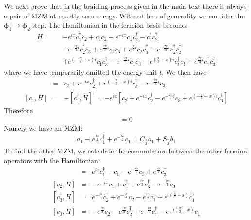 \documentclass[aps,prb,showpacs,amsmath,amssymb,superscriptaddress]{revtex4-2}
\begin{document}
We next prove that in the braiding process given in the main text there is always a pair of MZM at exactly zero energy. Without loss of generality we consider the $\boldsymbol{\phi}_1\rightarrow \boldsymbol{\phi}_2$ step. The Hamiltonian in the fermion basis becomes
\begin{eqnarray}
H =&& - e^{ix}c_1^\dag c_2 + c_1 c_2 + e^{-ix}c_1 c_2^\dag - c_1^\dag c_2^\dag \\\nonumber
&&- e^{-\frac{\pi}{3}i} c_2^\dag c_3 + e^{\frac{2\pi}{3}i} c_2 c_3 + e^{\frac{\pi}{3}i}c_2 c_3^\dag - e^{-\frac{2\pi}{3}i} c_2^\dag c_3^\dag \\\nonumber
&&+  e^{\left(-\frac{\pi}{3}-x\right)i} c_1 c_3^\dag  - e^{-\frac{2\pi}{3}i} c_1 c_3  - e^{\left(\frac{\pi}{3}+x\right)i} c_1^\dag c_3  + e^{\frac{2\pi}{3}i}  c_1^\dag c_3^\dag
\end{eqnarray}
where we have temporarily omitted the energy unit $t$. We then have
\begin{eqnarray}
	[c_1^\dag, H] &=& c_2 + e^{-ix} c_2^\dag + e^{\left(-\frac{\pi}{3}-x\right)i} c_3^\dag - e^{-\frac{2\pi}{3}i} c_3 \\\nonumber
	[c_1, H] &=& -[c_1^\dag, H]^\dag = -e^{ix} \left[ c_2 + e^{-i x}c_2^\dag - e^{-\frac{2\pi}{3}i} c_3 +  e^{\left(-\frac{\pi}{3}-x\right)i} c_3^\dag \right]
\end{eqnarray}
Therefore
\begin{eqnarray}
	[e^{\frac{ix}{2}}c_1^\dag + e^{-\frac{ix}{2}} c_1, H] = 0
\end{eqnarray}
Namely we have an MZM:
\begin{eqnarray}
	\tilde{a}_1 \equiv e^{\frac{ix}{2}}c_1^\dag + e^{-\frac{ix}{2}} c_1 = C_{\frac{x}{2}} a_1 + S_{\frac{x}{2}} b_1
\end{eqnarray}
To find the other MZM, we calculate the commutators between the other fermion operators with the Hamiltonian:
\begin{eqnarray}
	[c_2^\dag, H] &=& e^{ix} c_1^\dag - c_1 - e^{-\frac{i\pi}{3}} c_3 + e^{\frac{i\pi}{3}} c_3^\dag \\\nonumber
	[c_2, H] &=& -e^{-ix} c_1 + c_1^\dag + e^{\frac{i\pi}{3}} c_3^\dag - e^{-\frac{i\pi}{3}} c_3\\\nonumber
	[c_3^\dag, H] &=& e^{-\frac{i\pi}{3}}c_2^\dag + e^{-\frac{i\pi}{3}} c_2 - e^{\frac{i\pi}{3}} c_1 + e^{i\left(\frac{\pi}{3} + x \right)}c_1^\dag \\\nonumber
	[c_3, H]	&=& -e^{\frac{i\pi}{3}}c_2 - e^{\frac{i\pi}{3}} c_2^\dag + e^{-\frac{i\pi}{3}} c_1^\dag - e^{-i\left(\frac{\pi}{3} + x \right)}c_1
\end{eqnarray}
\end{document}
